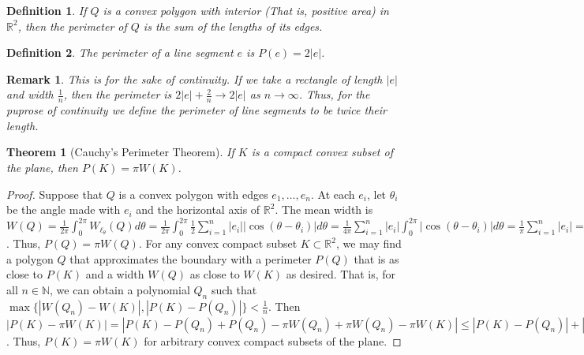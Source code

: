 \documentclass[12pt,oneside]{book}
\theoremstyle{mystyle}
\newtheorem{theorem}{Theorem}[section]
\newtheorem{definition}{Definition}[section]
\newtheorem{remark}{Remark}[section]
\begin{document}
\begin{definition}
If $Q$ is a convex polygon with interior (That is, positive area) in $\mathbb{R}^2$, then the perimeter of $Q$ is the sum of the lengths of its edges. 
\end{definition}

\begin{definition}
The perimeter of a line segment $e$ is $P(e) = 2|e|$.
\end{definition}

\begin{remark}
This is for the sake of continuity. If we take a rectangle of length $|e|$ and width $\frac{1}{n}$, then the perimeter is $2|e|+\frac{2}{n} \rightarrow 2|e|$ as $n\rightarrow \infty$. Thus, for the puprose of continuity we define the perimeter of line segments to be twice their length.
\end{remark}

\begin{theorem}[Cauchy's Perimeter Theorem]
If $K$ is a compact convex subset of the plane, then $P(K) = \pi W(K)$.
\end{theorem}
\begin{proof}
Suppose that $Q$ is a convex polygon with edges $e_1,\hdots, e_n$. At each $e_i$, let $\theta_i$ be the angle made with $e_i$ and the horizontal axis of $\mathbb{R}^2$. The mean width is $W(Q) = \frac{1}{2\pi}\int_{0}^{2\pi} W_{\ell_\theta}(Q)d\theta = \frac{1}{2\pi} \int_{0}^{2\pi} \frac{1}{2} \sum_{i=1}^{n} |e_i||\cos(\theta-\theta_i)|d\theta = \frac{1}{4\pi}\sum_{i=1}^{n} |e_i|\int_{0}^{2\pi} |\cos(\theta-\theta_i)|d\theta = \frac{1}{\pi} \sum_{i=1}^{n} |e_i| = \frac{1}{\pi} P(Q)$. Thus, $P(Q) = \pi W(Q)$. For any convex compact subset $K\subset \mathbb{R}^2$, we may find a polygon $Q$ that approximates the boundary with a perimeter $P(Q)$ that is as close to $P(K)$ and a width $W(Q)$ as close to $W(K)$ as desired. That is, for all $n\in \mathbb{N}$, we can obtain a polynomial $Q_n$ such that $\max\{|W(Q_n)-W(K)|,|P(K)-P(Q_n)|\}< \frac{1}{n}$. Then $|P(K)-\pi W(K)| = |P(K) - P(Q_n)+P(Q_n)-\pi W(Q_n)+\pi W(Q_n)-\pi W(K)| \leq |P(K)-P(Q_n)|+|P(Q_n)-\pi W(Q_n)|+\pi|W(Q_n)-W(K)| < \frac{1}{n} + 0 + \frac{\pi}{n} = \frac{1+\pi}{n} \rightarrow 0$. Thus, $P(K) = \pi W(K)$ for arbitrary convex compact subsets of the plane.
\end{proof}
 
\end{document}
